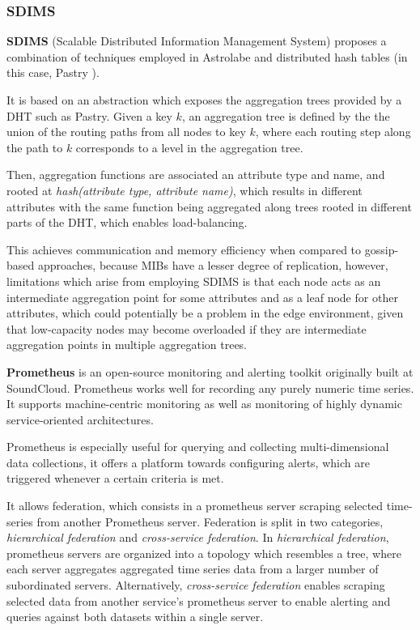 \subsubsection{SDIMS}

\textbf{SDIMS} \cite{SDIMS} (Scalable Distributed Information Management System) proposes a combination of techniques employed in Astrolabe \cite{Renesse2003} and distributed hash tables (in this case, Pastry \cite{rowstron2001pastry}).

It is based on an abstraction which exposes the aggregation trees provided by a DHT such as Pastry. Given a key $k$, an aggregation tree is defined by the the union of the routing paths from all nodes to key $k$, where each routing step along the path to $k$ corresponds to a level in the aggregation tree.

Then, aggregation functions are associated an attribute type and name, and rooted at \textit{hash(attribute type, attribute name)}, which results in different attributes with the same function being aggregated along trees rooted in different parts of the DHT, which enables load-balancing.

This achieves communication and memory efficiency when compared to gossip-based approaches, because MIBs have a lesser degree of replication, however, limitations which arise from employing SDIMS is that each node acts as an intermediate aggregation point for some attributes and as a leaf node for other attributes, which could potentially be a problem in the edge environment, given that low-capacity nodes may become overloaded if they are intermediate aggregation points in multiple aggregation trees. 

\textbf{Prometheus} \cite{prometheus} is an open-source monitoring and alerting toolkit originally built at SoundCloud. Prometheus works well for recording any purely numeric time series. It supports machine-centric monitoring as well as monitoring of highly dynamic service-oriented architectures. 

Prometheus is especially useful for querying and collecting multi-dimensional data collections, it offers a platform towards configuring alerts, which are triggered whenever a certain criteria is met. 

It allows federation, which consists in a prometheus server scraping selected time-series from another Prometheus server. Federation is split in two categories, \textit{hierarchical federation} and \textit{cross-service federation}. In \textit{hierarchical federation}, prometheus servers are organized into a topology which resembles a tree, where each server aggregates aggregated time series data from a larger number of subordinated servers. Alternatively,  \textit{cross-service federation} enables scraping selected data from another service's prometheus server to enable alerting and queries against both datasets within a single server. 

